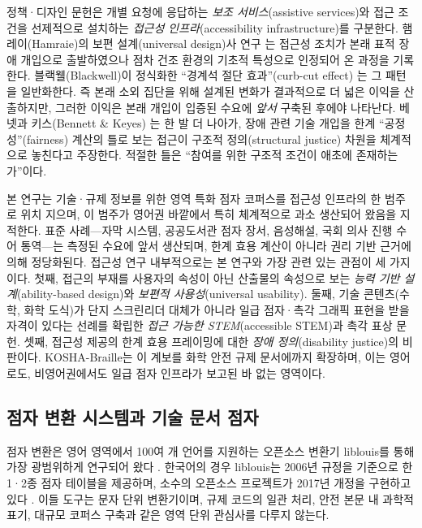 \documentclass[journal]{IEEEtran}
\begin{document}
정책·디자인 문헌은 개별 요청에 응답하는 \emph{보조 서비스}(assistive services)와 접근 조건을 선제적으로 설치하는 \emph{접근성 인프라}(accessibility infrastructure)를 구분한다. 햄레이(Hamraie)의 보편 설계(universal design)사 연구 \cite{hamraie}는 접근성 조치가 본래 표적 장애 개입으로 출발하였으나 점차 건조 환경의 기초적 특성으로 인정되어 온 과정을 기록한다. 블랙웰(Blackwell)이 정식화한 ``경계석 절단 효과''(curb-cut effect) \cite{curb_cut}는 그 패턴을 일반화한다. 즉 본래 소외 집단을 위해 설계된 변화가 결과적으로 더 넓은 이익을 산출하지만, 그러한 이익은 본래 개입이 입증된 수요에 \emph{앞서} 구축된 후에야 나타난다. 베넷과 키스(Bennett \& Keyes) \cite{bennett_keyes}는 한 발 더 나아가, 장애 관련 기술 개입을 한계 ``공정성''(fairness) 계산의 틀로 보는 접근이 구조적 정의(structural justice) 차원을 체계적으로 놓친다고 주장한다. 적절한 틀은 ``참여를 위한 구조적 조건이 애초에 존재하는가''이다.

본 연구는 기술·규제 정보를 위한 영역 특화 점자 코퍼스를 접근성 인프라의 한 범주로 위치 지으며, 이 범주가 영어권 바깥에서 특히 체계적으로 과소 생산되어 왔음을 지적한다. 표준 사례---자막 시스템, 공공도서관 점자 장서, 음성해설, 국회 의사 진행 수어 통역---는 측정된 수요에 앞서 생산되며, 한계 효용 계산이 아니라 권리 기반 근거에 의해 정당화된다. 접근성 연구 내부적으로는 본 연구와 가장 관련 있는 관점이 세 가지이다. 첫째, 접근의 부재를 사용자의 속성이 아닌 산출물의 속성으로 보는 \emph{능력 기반 설계}(ability-based design)와 \emph{보편적 사용성}(universal usability). 둘째, 기술 콘텐츠(수학, 화학 도식)가 단지 스크린리더 대체가 아니라 일급 점자·촉각 그래픽 표현을 받을 자격이 있다는 선례를 확립한 \emph{접근 가능한 STEM}(accessible STEM)과 촉각 표상 문헌. 셋째, 접근성 제공의 한계 효용 프레이밍에 대한 \emph{장애 정의}(disability justice)의 비판이다. KOSHA-Braille는 이 계보를 화학 안전 규제 문서에까지 확장하며, 이는 영어로도, 비영어권에서도 일급 점자 인프라가 보고된 바 없는 영역이다.

\subsection{점자 변환 시스템과 기술 문서 점자}

점자 변환은 영어 영역에서 100여 개 언어를 지원하는 오픈소스 변환기 liblouis를 통해 가장 광범위하게 연구되어 왔다 \cite{liblouis}. 한국어의 경우 liblouis는 2006년 규정을 기준으로 한 1·2종 점자 테이블을 제공하며, 소수의 오픈소스 프로젝트가 2017년 개정을 구현하고 있다 \cite{hangul_braille_converter,hanbraille}. 이들 도구는 문자 단위 변환기이며, 규제 코드의 일관 처리, 안전 본문 내 과학적 표기, 대규모 코퍼스 구축과 같은 영역 단위 관심사를 다루지 않는다.
\end{document}
